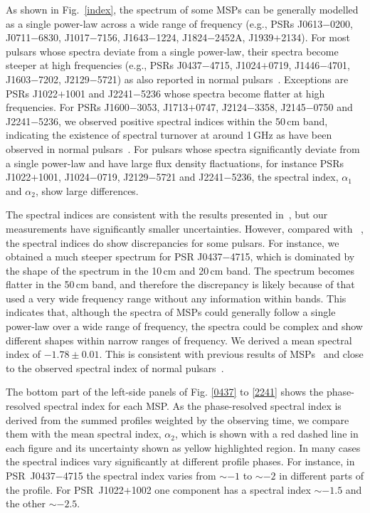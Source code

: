 \documentclass[useAMS,usenatbib]{mn2e}
\begin{document}
As shown in Fig.~\ref{index}, the spectrum of some MSPs can be generally modelled as 
a single power-law across a wide range of frequency (e.g., PSRs J0613$-$0200, J0711$-$6830, 
J1017$-$7156, J1643$-$1224, J1824$-$2452A, J1939$+$2134). 
%
For most pulsars whose spectra deviate from a single power-law, their spectra 
become steeper at high frequencies (e.g., PSRs J0437$-$4715, J1024$+$0719, J1446$-$4701, 
J1603$-$7202, J2129$-$5721) as also reported in normal pulsars~\citep[e.g.,][]{Maron00}.
%
Exceptions are PSRs J1022$+$1001 and J2241$-$5236 whose spectra become flatter at high 
frequencies.
%
For PSRs J1600$-$3053, J1713$+$0747, J2124$-$3358, J2145$-$0750 and J2241$-$5236, we 
observed positive spectral indices within the 50\,cm band, indicating the existence of spectral 
turnover at around 1\,GHz as have been observed in normal pulsars~\citep[e.g.,][]{Kijak11}.
%
For pulsars whose spectra significantly deviate from a single power-law and have large 
flux density flactuations, for instance PSRs J1022$+$1001, J1024−0719, J2129−5721 
and J2241$-$5236, the spectral index, $\alpha_1$ and $\alpha_2$, show large 
differences.

The spectral indices are consistent with the results presented in~\citet{Toscano98}, 
but our measurements have significantly smaller uncertainties. However, compared with 
~\citet{Kramer99}, the spectral indices do show discrepancies for some pulsars. 
For instance, we obtained a much steeper spectrum for PSR J0437$-$4715, which is 
dominated by the shape of the spectrum in the 10\,cm and 20\,cm band. The spectrum 
becomes flatter in the 50\,cm band, and therefore the discrepancy is likely because of 
that~\citet{Kramer99} used a very wide frequency range without any information within 
bands. This indicates that, although the spectra of MSPs could generally follow a 
single power-law over a wide range of frequency, the spectra could be complex and 
show different shapes within narrow ranges of frequency.
%
%
We derived a mean spectral index of $-1.78\pm0.01$. This is consistent with 
previous results of MSPs~\citep{Toscano98,Kramer99} and close to the  
observed spectral index of normal pulsars~\citep{Lorimer95,Maron00}. 
%

The bottom part of the left-side panels of Fig. \ref{0437} to 
\ref{2241} shows the phase-resolved spectral index for each MSP. 
%
As the phase-resolved spectral index is derived from the summed profiles weighted 
by the observing time, we compare them with the mean spectral index, $\alpha_2$, 
which is shown with a red dashed line in each figure and its uncertainty shown as 
yellow highlighted region.
%
In many cases the spectral indices vary significantly at different profile phases. 
For instance, in PSR~J0437$-$4715 the spectral index varies from $\sim -1$ to $\sim -2$ in 
different parts of the profile. For PSR~J1022$+$1002 one component has a spectral 
index $\sim -1.5$ and the other $\sim -2.5$. 
%
\end{document}
